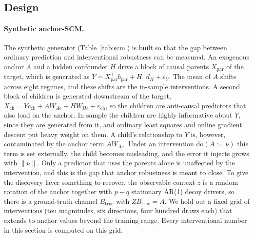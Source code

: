 \documentclass[12pt]{article}
\theoremstyle{plain}
\theoremstyle{remark}
\newcommand{\doop}{\mathrm{do}}
\begin{document}
\subsection{Design}

\paragraph{Synthetic anchor-SCM.}
The synthetic generator (Table~\ref{tab:scm}) is built so that the gap between
ordinary prediction and interventional robustness can be measured. An exogenous anchor
$A$ and a hidden confounder $H$ drive a block of causal parents $X_{\mathrm{par}}$ of
the target, which is generated as $Y=X_{\mathrm{par}}^\top b_{\mathrm{par}}+H^\top d_H+
\varepsilon_Y$. The mean of $A$ shifts across eight regimes, and these shifts are the
in-sample interventions. A second block of children is generated downstream of the
target, $X_{\mathrm{ch}}=Yc_{\mathrm{ch}}+AW_{Ac}+HW_{Hc}+\varepsilon_{\mathrm{ch}}$,
so the children are anti-causal predictors that also load on the anchor. In sample the
children are highly informative about $Y$, since they are generated from it, and
ordinary least squares and online gradient descent put heavy weight on them. A child's
relationship to $Y$ is, however, contaminated by the anchor term $AW_{Ac}$. Under an
intervention $\doop(A:=\nu)$ this term is set externally, the child becomes misleading,
and the error it injects grows with $\|\nu\|$. Only a predictor that uses the parents
alone is unaffected by the intervention, and this is the gap that anchor robustness is
meant to close. To give the discovery layer something to recover, the observable
context $z$ is a random rotation of the anchor together with $p-q$ stationary AR(1)
decoy drivers, so there is a ground-truth channel $B_{\text{true}}$ with
$ZB_{\text{true}}=A$. We hold out a fixed grid of interventions (ten magnitudes, six
directions, four hundred draws each) that extends to anchor values beyond the training
range. Every interventional number in this section is computed on this grid.
\end{document}
